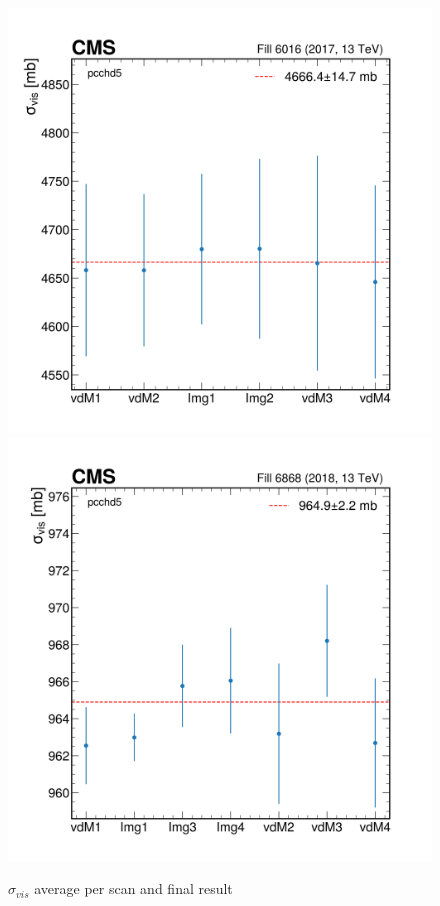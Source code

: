 \begin{figure}[h]
\centering
\includegraphics[width=.49\textwidth]{figures/vdMfitting/sigVis/Sigma_vis_6016_new.png}
\includegraphics[width=.49\textwidth]{figures/vdMfitting/sigVis/Sigma_vis_6868_new.png}
\caption[$\sigma_{vis}$ average per scan and final result]{$\sigma_{vis}$ average per scan and final result}
\label{sigmavis_perscan}
\end{figure}


